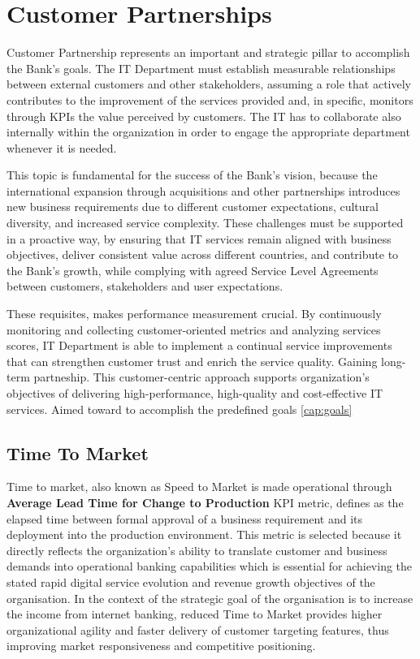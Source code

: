 \chapter{Customer Partnerships}
\label{cap:customerpartnerships}


Customer Partnership represents an important and strategic pillar to accomplish the Bank's goals. The IT Department must establish measurable relationships between external customers and other stakeholders, assuming a role that actively contributes to the improvement of the services provided and, in specific, monitors through KPIs the value perceived by customers.
The IT has to collaborate also internally within the organization in order to engage the appropriate department whenever it is needed.



This topic is fundamental for the success of the Bank's vision, because the international expansion through acquisitions and other partnerships introduces new business requirements due to different customer expectations, cultural diversity, and increased service complexity.
These challenges must be supported in a proactive way, by ensuring that IT services remain aligned with business objectives, deliver consistent value across different countries, and contribute to the Bank's growth, while complying with agreed Service Level Agreements between customers, stakeholders and user expectations.




These requisites, makes performance measurement crucial. By continuously monitoring and collecting customer-oriented metrics and analyzing services scores, IT Department is able to implement a continual service improvements that can strengthen customer trust and enrich the service quality. Gaining long-term partneship.
This customer-centric approach supports organization's objectives of delivering high-performance, high-quality and cost-effective IT services. Aimed toward to accomplish the predefined goals \ref{cap:goals}


\section{Time To Market}

Time to market, also known as Speed to Market is made operational through \textbf{Average Lead Time for Change to Production} KPI metric, defines as the elapsed time between formal approval of a business requirement and its deployment into the production environment. This metric is selected because it directly reflects the organization’s ability to translate customer and business demands into operational banking capabilities which is essential for achieving the stated rapid digital service evolution and revenue growth objectives of the organisation. In the context of the strategic goal of the organisation is to increase the income from internet banking, reduced Time to Market provides higher organizational agility and faster delivery of customer targeting features, thus improving market responsiveness and competitive positioning.


